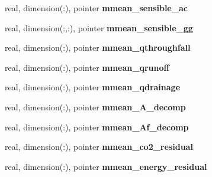 \begin{DoxyCompactItemize}
\item 
\hypertarget{structed__state__vars_1_1sitetype_ae32765dc67fda7f1ff3c291631af9747}{
real, dimension(:), pointer {\bfseries mmean\_\-sensible\_\-ac}}
\label{structed__state__vars_1_1sitetype_ae32765dc67fda7f1ff3c291631af9747}

\item 
\hypertarget{structed__state__vars_1_1sitetype_aeda9f19514d104147d6ccd903012ae1c}{
real, dimension(:,:), pointer {\bfseries mmean\_\-sensible\_\-gg}}
\label{structed__state__vars_1_1sitetype_aeda9f19514d104147d6ccd903012ae1c}

\item 
\hypertarget{structed__state__vars_1_1sitetype_a17643b483dd01d6469e7b0193252af29}{
real, dimension(:), pointer {\bfseries mmean\_\-qthroughfall}}
\label{structed__state__vars_1_1sitetype_a17643b483dd01d6469e7b0193252af29}

\item 
\hypertarget{structed__state__vars_1_1sitetype_ac72b6dc44d8972ddadca9429d089a141}{
real, dimension(:), pointer {\bfseries mmean\_\-qrunoff}}
\label{structed__state__vars_1_1sitetype_ac72b6dc44d8972ddadca9429d089a141}

\item 
\hypertarget{structed__state__vars_1_1sitetype_a45c3fa9f94428fa0f250324241ecf342}{
real, dimension(:), pointer {\bfseries mmean\_\-qdrainage}}
\label{structed__state__vars_1_1sitetype_a45c3fa9f94428fa0f250324241ecf342}

\item 
\hypertarget{structed__state__vars_1_1sitetype_a6be45ecec3d92b39afa1166eb6067ab5}{
real, dimension(:), pointer {\bfseries mmean\_\-A\_\-decomp}}
\label{structed__state__vars_1_1sitetype_a6be45ecec3d92b39afa1166eb6067ab5}

\item 
\hypertarget{structed__state__vars_1_1sitetype_a185e28f3c5d4f8165614af07b62f0b4c}{
real, dimension(:), pointer {\bfseries mmean\_\-Af\_\-decomp}}
\label{structed__state__vars_1_1sitetype_a185e28f3c5d4f8165614af07b62f0b4c}

\item 
\hypertarget{structed__state__vars_1_1sitetype_aef0b8b85d8224cb71e5f2e87d0a4790d}{
real, dimension(:), pointer {\bfseries mmean\_\-co2\_\-residual}}
\label{structed__state__vars_1_1sitetype_aef0b8b85d8224cb71e5f2e87d0a4790d}

\item 
\hypertarget{structed__state__vars_1_1sitetype_aa381671448b24aab40a20a94cf2d0e56}{
real, dimension(:), pointer {\bfseries mmean\_\-energy\_\-residual}}
\label{structed__state__vars_1_1sitetype_aa381671448b24aab40a20a94cf2d0e56}


\end{DoxyCompactItemize}
